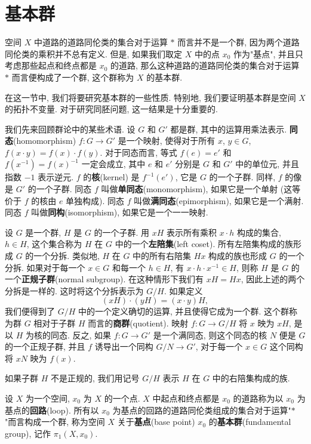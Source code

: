 ﻿\section{基本群}
\label{section:ch09-sec52}

空间 $X$ 中道路的道路同伦类的集合对于运算 $*$ 而言并不是一个群, 因为两个道路同伦类的乘积并不总有定义. 但是, 如果我们取定 $X$ 中的点 $x_0$ 作为"基点", 并且只考虑那些起点和终点都是 $x_0$ 的道路, 那么这种道路的道路同伦类的集合对于运算 $*$ 而言便构成了一个群, 这个群称为 $X$ 的基本群.

在这一节中, 我们将要研究基本群的一些性质. 特别地, 我们要证明基本群是空间 $X$ 的拓扑不变量. 对于研究同胚问题, 这一结果是十分重要的.

我们先来回顾群论中的某些术语. 设 $G$ 和 $G'$ 都是群, 其中的运算用乘法表示. \textbf{同态}(homomorphism) $f\colon G\to G'$ 是一个映射, 使得对于所有 $x$, $y\in G$, $f(x\cdot y)=f(x)\cdot f(y)$. 对于同态而言, 等式 $f(e)=e'$ 和 $f(x^{-1})=f(x)^{-1}$ 一定会成立, 其中 $e$ 和 $e'$ 分别是 $G$ 和 $G'$ 中的单位元, 并且指数 $-1$ 表示逆元. $f$ 的\textbf{核}(kernel) 是 $f^{-1}(e')$, 它是 $G$ 的一个子群. 同样, $f$ 的像是 $G'$ 的一个子群. 同态 $f$ 叫做\textbf{单同态}(monomorphism), 如果它是一个单射 (这等价于 $f$ 的核由 $e$ 单独构成). 同态 $f$ 叫做\textbf{满同态}(epimorphism), 如果它是一个满射. 同态 $f$ 叫做\textbf{同构}(isomorphism), 如果它是一个一一映射.

设 $G$ 是一个群, $H$ 是 $G$ 的一个子群. 用 $xH$ 表示所有乘积 $x\cdot h$ 构成的集合, $h\in H$, 这个集合称为 $H$ 在 $G$ 中的一个\textbf{左陪集}(left coset). 所有左陪集构成的族形成 $G$ 的一个分拆. 类似地, $H$ 在 $G$ 中的所有右陪集 $Hx$ 构成的族也形成 $G$ 的一个分拆. 如果对于每一个 $x\in G$ 和每一个 $h\in H$, 有 $x\cdot h\cdot x^{-1}\in H$, 则称 $H$ 是 $G$ 的一个\textbf{正规子群}(normal subgroup). 在这种情形下我们有 $xH=Hx$, 因此上述的两个分拆是一样的. 这时将这个分拆表示为 $G/H$. 如果定义
\[
(xH)\cdot(yH)=(x\cdot y)H,
\]
我们便得到了 $G/H$ 中的一个定义确切的运算, 并且使得它成为一个群. 这个群称为群 $G$ 相对于子群 $H$ 而言的\textbf{商群}(quotient). 映射 $f\colon G\to G/H$ 将 $x$ 映为 $xH$, 是以 $H$ 为核的同态. 反之, 如果 $f\colon G\to G'$ 是一个满同态, 则这个同态的核 $N$ 便是 $G$ 的一个正规子群, 并且 $f$ 诱导出一个同构 $G/N\to G'$, 对于每一个 $x\in G$ 这个同构将 $xN$ 映为 $f(x)$.

如果子群 $H$ 不是正规的, 我们用记号 $G/H$ 表示 $H$ 在 $G$ 中的右陪集构成的族.

\begin{definition}[基本群]
\label{definition:ch09-sec52-pi1}
设 $X$ 为一个空间, $x_0$ 为 $X$ 的一个点. $X$ 中起点和终点都是 $x_0$ 的道路称为以 $x_0$ 为基点的\textbf{回路}(loop). 所有以 $x_0$ 为基点的回路的道路同伦类组成的集合对于运算"$*$"而言构成一个群, 称为空间 $X$ 关于\textbf{基点}(base point) $x_0$ 的\textbf{基本群}(fundamental group), 记作 $\pi_1(X,x_0)$.
\end{definition}

